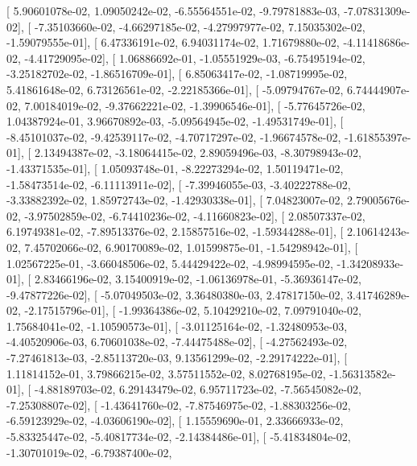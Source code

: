\documentclass{article}
\begin{document}
       [  5.90601078e-02,   1.09050242e-02,  -6.55564551e-02,
         -9.79781883e-03,  -7.07831309e-02],
       [ -7.35103660e-02,  -4.66297185e-02,  -4.27997977e-02,
          7.15035302e-02,  -1.59079555e-01],
       [  6.47336191e-02,   6.94031174e-02,   1.71679880e-02,
         -4.11418686e-02,  -4.41729095e-02],
       [  1.06886692e-01,  -1.05551929e-03,  -6.75495194e-02,
         -3.25182702e-02,  -1.86516709e-01],
       [  6.85063417e-02,  -1.08719995e-02,   5.41861648e-02,
          6.73126561e-02,  -2.22185366e-01],
       [ -5.09794767e-02,   6.74444907e-02,   7.00184019e-02,
         -9.37662221e-02,  -1.39906546e-01],
       [ -5.77645726e-02,   1.04387924e-01,   3.96670892e-03,
         -5.09564945e-02,  -1.49531749e-01],
       [ -8.45101037e-02,  -9.42539117e-02,  -4.70717297e-02,
         -1.96674578e-02,  -1.61855397e-01],
       [  2.13494387e-02,  -3.18064415e-02,   2.89059496e-03,
         -8.30798943e-02,  -1.43371535e-01],
       [  1.05093748e-01,  -8.22273294e-02,   1.50119471e-02,
         -1.58473514e-02,  -6.11113911e-02],
       [ -7.39946055e-03,  -3.40222788e-02,  -3.33882392e-02,
          1.85972743e-02,  -1.42930338e-01],
       [  7.04823007e-02,   2.79005676e-02,  -3.97502859e-02,
         -6.74410236e-02,  -4.11660823e-02],
       [  2.08507337e-02,   6.19749381e-02,  -7.89513376e-02,
          2.15857516e-02,  -1.59344288e-01],
       [  2.10614243e-02,   7.45702066e-02,   6.90170089e-02,
          1.01599875e-01,  -1.54298942e-01],
       [  1.02567225e-01,  -3.66048506e-02,   5.44429422e-02,
         -4.98994595e-02,  -1.34208933e-01],
       [  2.83466196e-02,   3.15400919e-02,  -1.06136978e-01,
         -5.36936147e-02,  -9.47877226e-02],
       [ -5.07049503e-02,   3.36480380e-03,   2.47817150e-02,
          3.41746289e-02,  -2.17515796e-01],
       [ -1.99364386e-02,   5.10429210e-02,   7.09791040e-02,
          1.75684041e-02,  -1.10590573e-01],
       [ -3.01125164e-02,  -1.32480953e-03,  -4.40520906e-03,
          6.70601038e-02,  -7.44475488e-02],
       [ -4.27562493e-02,  -7.27461813e-03,  -2.85113720e-03,
          9.13561299e-02,  -2.29174222e-01],
       [  1.11814152e-01,   3.79866215e-02,   3.57511552e-02,
          8.02768195e-02,  -1.56313582e-01],
       [ -4.88189703e-02,   6.29143479e-02,   6.95711723e-02,
         -7.56545082e-02,  -7.25308807e-02],
       [ -1.43641760e-02,  -7.87546975e-02,  -1.88303256e-02,
         -6.59123929e-02,  -4.03606190e-02],
       [  1.15559690e-01,   2.33666933e-02,  -5.83325447e-02,
         -5.40817734e-02,  -2.14384486e-01],
       [ -5.41834804e-02,  -1.30701019e-02,  -6.79387400e-02,
\end{document}
